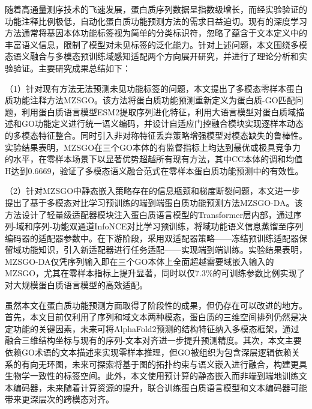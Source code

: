 
\begin{conclusions}
随着高通量测序技术的飞速发展，蛋白质序列数据呈指数级增长，而经实验验证的功能注释比例极低，自动化蛋白质功能预测方法的需求日益迫切。现有的深度学习方法通常将基因本体功能标签视为简单的分类标识符，忽略了蕴含于文本定义中的丰富语义信息，限制了模型对未见标签的泛化能力。针对上述问题，本文围绕多模态语义融合与多模态预训练域感知适配两个方向展开研究，并进行了理论分析和实验验证。主要研究成果总结如下：

（1）针对现有方法无法预测未见功能标签的问题，本文提出了多模态零样本蛋白质功能注释方法MZSGO。该方法将蛋白质功能预测重新定义为蛋白质-GO匹配问题，利用蛋白质语言模型ESM2提取序列进化特征，利用大语言模型对蛋白质域描述和GO功能定义进行统一语义编码，并设计自适应门控融合模块实现逐样本动态的多模态特征整合。同时引入非对称特征丢弃策略增强模型对模态缺失的鲁棒性。实验结果表明，MZSGO在三个GO本体的有监督指标上均达到最优或极具竞争力的水平，在零样本场景下以显著优势超越所有现有方法，其中CC本体的调和均值H达到0.6669，验证了多模态语义融合范式在零样本蛋白质功能预测中的有效性。

（2）针对MZSGO中静态嵌入策略存在的信息瓶颈和梯度断裂问题，本文进一步提出了基于多模态对比学习预训练的端到端蛋白质功能预测方法MZSGO-DA。该方法设计了轻量级适配器模块注入蛋白质语言模型的Transformer层内部，通过序列-域和序列-功能双通道InfoNCE对比学习预训练，将域功能语义信息蒸馏至序列编码器的适配器参数中。在下游阶段，采用双适配器策略——冻结预训练适配器保留域功能知识，引入新适配器进行任务适配——实现端到端训练。实验结果表明，MZSGO-DA仅凭序列输入即在三个GO本体上全面超越需要域嵌入输入的MZSGO，尤其在零样本指标上提升显著，同时以仅7.3\%的可训练参数比例实现了对大规模蛋白质语言模型的高效适配。

虽然本文在蛋白质功能预测方面取得了阶段性的成果，但仍存在可以改进的地方。首先，本文目前仅利用了序列和域文本两种模态，蛋白质的三维空间排列仍然是决定功能的关键因素，未来可将AlphaFold2预测的结构特征纳入多模态框架，通过融合三维结构坐标与现有的序列-文本对齐进一步提升预测精度。其次，本文主要依赖GO术语的文本描述来实现零样本推理，但GO被组织为包含深层逻辑依赖关系的有向无环图，未来可探索将基于图的拓扑约束与语义嵌入进行融合，构建更具生物学一致性的标签空间。此外，本文使用预计算的静态嵌入而非端到端地训练文本编码器，未来随着计算资源的提升，联合训练蛋白质语言模型和文本编码器可能带来更深层次的跨模态对齐。

\end{conclusions}

